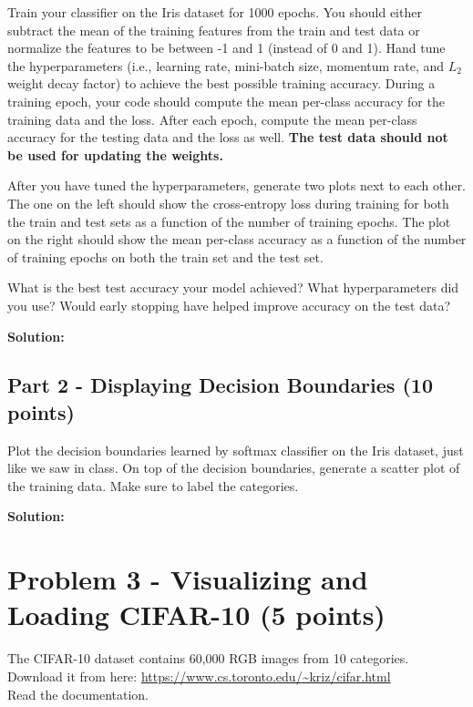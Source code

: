 \documentclass[11pt, oneside]{article}   	%
\begin{document}
Train your classifier on the Iris dataset for 1000 epochs. You should either subtract the mean of the training features from the train and test data or normalize the features to be between -1 and 1 (instead of 0 and 1). Hand tune the hyperparameters (i.e., learning rate, mini-batch size, momentum rate, and $L_2$ weight decay factor) to achieve the best possible training accuracy. During a training epoch, your code should compute the mean per-class accuracy for the training data and the loss. After each epoch, compute the mean per-class accuracy for the testing data and the loss as well. \textbf{The test data should not be used for updating the weights.}

After you have tuned the hyperparameters, generate two plots next to each other. The one on the left should show the cross-entropy loss during training for both the train and test sets as a function of the number of training epochs. The plot on the right should show the mean per-class accuracy as a function of the number of training epochs on both the train set and the test set. 

What is the best test accuracy your model achieved? What hyperparameters did you use? Would early stopping have helped improve accuracy on the test data?

\textbf{Solution:} \\



\subsection*{Part 2 - Displaying Decision Boundaries (10 points)}

Plot the decision boundaries learned by softmax classifier on the Iris dataset, just like we saw in class. On top of the decision boundaries, generate a scatter plot of the training data. Make sure to label the categories.

\textbf{Solution:} \\




\section*{Problem 3 - Visualizing and Loading CIFAR-10 (5 points)}

The CIFAR-10 dataset contains 60,000 RGB images from 10 categories. Download it from here: \url{https://www.cs.toronto.edu/~kriz/cifar.html}\\
Read the documentation.
\end{document}
